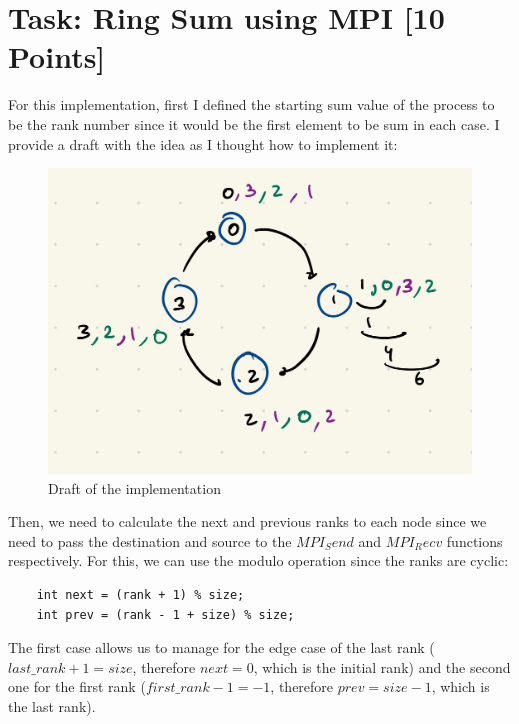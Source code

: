 \documentclass[unicode,11pt,a4paper,oneside,numbers=endperiod,openany]{scrartcl}
\begin{document}
\setassignment

\newline

\assignmentpolicy

\section{Task: Ring Sum using MPI [10 Points]}
For this implementation, first I defined the starting sum value of the process to be the rank number since
it would be the first element to be sum in each case. I provide a draft with the idea as I thought how to implement it:

\begin{figure}[H]
    \centering
    \includegraphics[width=\textwidth]{./img/exe1/idea.jpeg}
    \caption{Draft of the implementation}
  \end{figure}

Then, we need to calculate the next and previous ranks to each node since we need to pass the destination and source to the $MPI_Send$ and $MPI_Recv$ functions respectively. 
For this, we can use the modulo operation since the ranks are cyclic:

\begin{verbatim}
    int next = (rank + 1) % size;
    int prev = (rank - 1 + size) % size;
\end{verbatim}

The first case allows us to manage for the edge case of the last rank ($last\_rank + 1 = size$, therefore $next = 0$, which is the initial rank) and the second one for the first rank ($first\_rank - 1 = -1$, therefore $prev = size - 1$, which is the last rank).
\end{document}
